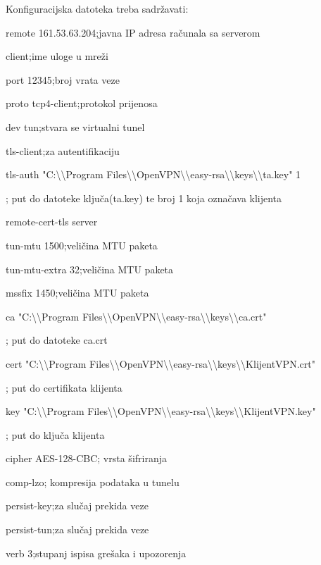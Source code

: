 Konfiguracijska datoteka treba sadržavati:\smallbreak
{\small{}\selectfont
remote 161.53.63.204\hfill;javna IP adresa računala sa serverom

client\hfill;ime uloge u mreži

port 12345\hfill;broj vrata veze

proto tcp4-client\hfill;protokol prijenosa

dev tun\hfill;stvara se virtualni tunel

tls-client\hfill;za autentifikaciju

tls-auth "C:\textbackslash \textbackslash Program Files\textbackslash \textbackslash OpenVPN\textbackslash \textbackslash easy-rsa\textbackslash \textbackslash keys\textbackslash \textbackslash ta.key" 1\hfill

; put do datoteke ključa(ta.key) te broj 1 koja označava klijenta

remote-cert-tls server

tun-mtu 1500\hfill;veličina MTU paketa

tun-mtu-extra 32\hfill;veličina MTU paketa

mssfix 1450\hfill;veličina MTU paketa

ca "C:\textbackslash \textbackslash Program Files\textbackslash \textbackslash OpenVPN\textbackslash \textbackslash easy-rsa\textbackslash \textbackslash keys\textbackslash \textbackslash ca.crt"\hfill

; put do datoteke ca.crt

cert "C:\textbackslash \textbackslash Program Files\textbackslash \textbackslash OpenVPN\textbackslash \textbackslash easy-rsa\textbackslash \textbackslash keys\textbackslash \textbackslash KlijentVPN.crt"\hfill

; put do certifikata klijenta

key "C:\textbackslash \textbackslash Program Files\textbackslash \textbackslash OpenVPN\textbackslash \textbackslash easy-rsa\textbackslash \textbackslash keys\textbackslash \textbackslash KlijentVPN.key"\hfill

; put do ključa klijenta

cipher AES-128-CBC\hfill; vrsta šifriranja

comp-lzo\hfill; kompresija podataka u tunelu

persist-key\hfill;za slučaj prekida veze

persist-tun\hfill;za slučaj prekida veze

verb 3\hfill;stupanj ispisa grešaka i upozorenja

}\bigbreak

